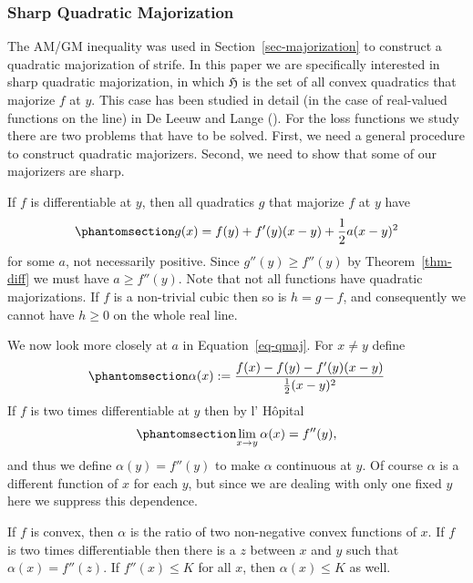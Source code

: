 \documentclass[
  12pt,
  letterpaper,
  DIV=11,
  numbers=noendperiod]{scrartcl}
\theoremstyle{definition}
\theoremstyle{plain}
\theoremstyle{plain}
\theoremstyle{remark}
\begin{document}
\subsubsection{Sharp Quadratic
Majorization}\label{sharp-quadratic-majorization}

The AM/GM inequality was used in Section~\ref{sec-majorization} to
construct a quadratic majorization of strife. In this paper we are
specifically interested in sharp quadratic majorization, in which
\(\mathfrak{H}\) is the set of all convex quadratics that majorize \(f\)
at \(y\). This case has been studied in detail (in the case of
real-valued functions on the line) in De Leeuw and Lange
(). For the loss functions we
study there are two problems that have to be solved. First, we need a
general procedure to construct quadratic majorizers. Second, we need to
show that some of our majorizers are sharp.

If \(f\) is differentiable at \(y\), then all quadratics \(g\) that
majorize \(f\) at \(y\) have
\begin{equation}\phantomsection\label{eq-qmaj}{
g(x)=f(y)+f'(y)(x-y)+\frac12a(x-y)^2
}\end{equation} for some \(a\), not necessarily positive. Since
\(g''(y)\geq f''(y)\) by Theorem~\ref{thm-diff} we must have
\(a\geq f''(y)\). Note that not all functions have quadratic
majorizations. If \(f\) is a non-trivial cubic then so is \(h=g-f\), and
consequently we cannot have \(h\geq 0\) on the whole real line.

We now look more closely at \(a\) in Equation~\ref{eq-qmaj}. For
\(x\not = y\) define \begin{equation}\phantomsection\label{eq-alpdef}{
\alpha(x):=\frac{f(x)-f(y)-f'(y)(x-y)}{\frac12(x-y)^2}
}\end{equation} If \(f\) is two times differentiable at \(y\) then by l'
Hôpital \begin{equation}\phantomsection\label{eq-alphop}{
\lim_{x\rightarrow y}\alpha(x)=f''(y),
}\end{equation} and thus we define \(\alpha(y)=f''(y)\) to make
\(\alpha\) continuous at \(y\). Of course \(\alpha\) is a different
function of \(x\) for each \(y\), but since we are dealing with only one
fixed \(y\) here we suppress this dependence.

If \(f\) is convex, then \(\alpha\) is the ratio of two non-negative
convex functions of \(x\). If \(f\) is two times differentiable then
there is a \(z\) between \(x\) and \(y\) such that \(\alpha(x)=f''(z)\).
If \(f''(x)\leq K\) for all \(x\), then \(\alpha(x)\leq K\) as well.
\end{document}
